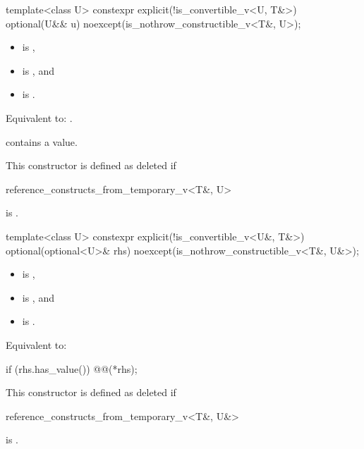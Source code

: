 \begin{itemdecl}
template<class U>
  constexpr explicit(!is_convertible_v<U, T&>)
  optional(U&& u) noexcept(is_nothrow_constructible_v<T&, U>);
\end{itemdecl}

\begin{itemdescr}
\pnum
\constraints
\begin{itemize}
\item {} is ,
\item {} is , and
\item {} is .
\end{itemize}

\pnum
\effects
Equivalent to: .

\pnum
\ensures
{} contains a value.

\pnum
\remarks
 This constructor is defined as deleted if
\begin{codeblock}
reference_constructs_from_temporary_v<T&, U>
\end{codeblock}
 is .
\end{itemdescr}

\begin{itemdecl}
template<class U>
  constexpr explicit(!is_convertible_v<U&, T&>)
  optional(optional<U>& rhs) noexcept(is_nothrow_constructible_v<T&, U&>);
\end{itemdecl}

\begin{itemdescr}
\pnum
\constraints
\begin{itemize}
\item {} is ,
\item {} is , and
\item {} is .
\end{itemize}

\pnum
\effects
Equivalent to:
\begin{codeblock}
if (rhs.has_value()) @@(*rhs);
\end{codeblock}

\pnum
\remarks
This constructor is defined as deleted if
\begin{codeblock}
reference_constructs_from_temporary_v<T&, U&>
\end{codeblock}
is .
\end{itemdescr}


